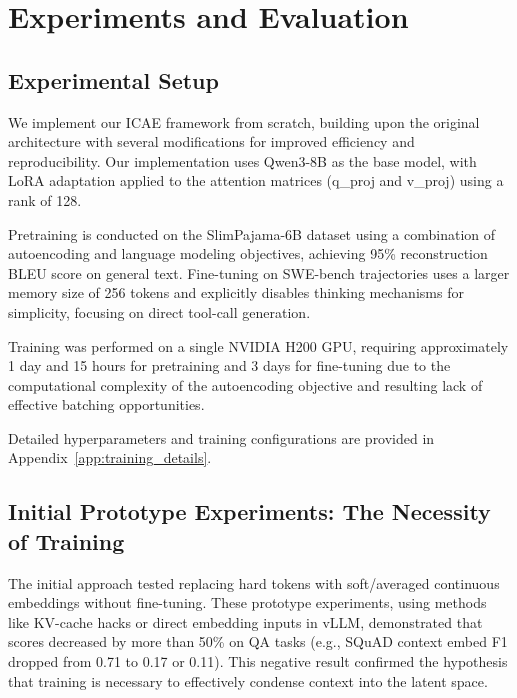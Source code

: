 \chapter{Experiments and Evaluation}

\section{Experimental Setup}

We implement our ICAE framework from scratch, building upon the original architecture \cite{ge_-context_2024} with several modifications for improved efficiency and reproducibility. Our implementation uses Qwen3-8B as the base model, with LoRA adaptation applied to the attention matrices (q\_proj and v\_proj) using a rank of 128.

Pretraining is conducted on the SlimPajama-6B dataset using a combination of autoencoding and language modeling objectives, achieving 95\% reconstruction BLEU score on general text. Fine-tuning on SWE-bench trajectories uses a larger memory size of 256 tokens and explicitly disables thinking mechanisms for simplicity, focusing on direct tool-call generation.

Training was performed on a single NVIDIA H200 GPU, requiring approximately 1 day and 15 hours for pretraining and 3 days for fine-tuning due to the computational complexity of the autoencoding objective and resulting lack of effective batching opportunities.

Detailed hyperparameters and training configurations are provided in Appendix~\ref{app:training_details}.


\section{Initial Prototype Experiments: The Necessity of Training}

The initial approach tested replacing hard tokens with soft/averaged continuous embeddings without fine-tuning.
These prototype experiments, using methods like KV-cache hacks or direct embedding inputs in vLLM, demonstrated that scores decreased by more than 50\% on QA tasks (e.g., SQuAD context embed F1 dropped from 0.71 to 0.17 or 0.11).
This negative result confirmed the hypothesis that training is necessary to effectively condense context into the latent space.

